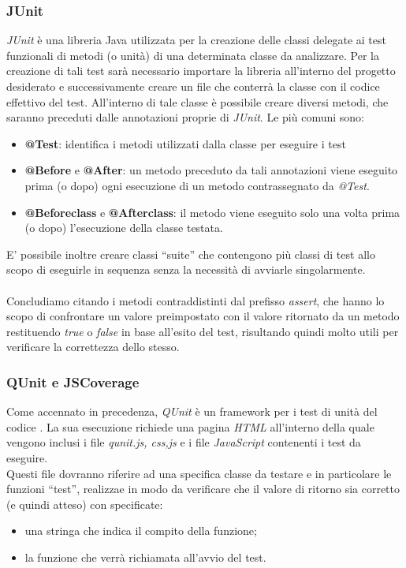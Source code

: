 {\subsubsection{JUnit}
\textit{JUnit} è una libreria Java utilizzata per la creazione delle classi delegate ai test funzionali di metodi (o unità) di una determinata classe da analizzare.
Per la creazione di tali test sarà necessario importare la libreria all'interno del progetto desiderato e successivamente creare un file che conterrà la classe con il codice effettivo del test.
All'interno di tale classe è possibile creare diversi metodi, che saranno preceduti dalle annotazioni proprie di \textit{JUnit}. Le più comuni sono:
\begin{itemize}
\item \textbf{@Test}: identifica i metodi utilizzati dalla classe per eseguire i test
\item \textbf{@Before} e \textbf{@After}: un metodo preceduto da tali annotazioni viene eseguito prima (o dopo) ogni esecuzione di un metodo contrassegnato da \textit{@Test}.
\item \textbf{@Beforeclass} e \textbf{@Afterclass}: il metodo viene eseguito solo una volta prima (o dopo) l'esecuzione della classe testata.
\end{itemize}
E' possibile inoltre creare classi ``suite'' che contengono più classi di test allo scopo di eseguirle in sequenza senza la necessità di avviarle singolarmente.\\\\
Concludiamo citando i metodi contraddistinti dal prefisso \textit{assert}, che hanno lo scopo di confrontare un valore preimpostato con il valore ritornato da un metodo restituendo \textit{true} o \textit{false} in base all'esito del test, risultando quindi molto utili per verificare la correttezza dello stesso.

\subsubsection{QUnit e JSCoverage}
Come accennato in precedenza, \textit{QUnit} è un framework per i test di unità del codice . La sua esecuzione richiede una pagina \textit{HTML} all'interno della quale vengono inclusi i file \textit{qunit.js, css,js} e i file \textit{JavaScript} contenenti i test da eseguire.\\
Questi file dovranno riferire ad una specifica classe da testare e in particolare le funzioni ``test'', realizzae in modo da verificare che il valore di ritorno sia corretto (e quindi atteso) con specificate:
\begin{itemize}
\item una stringa che indica il compito della funzione;
\item la funzione che verrà richiamata all'avvio del test.
\end{itemize}

}
